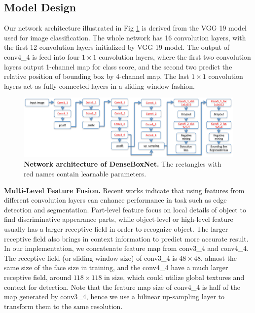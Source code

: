 \subsection{Model Design } 

Our network architecture illustrated in Fig \ref{fig:fig_net} is derived from the VGG 19 model used for image classification\cite{simonyan2014very}. The whole network has 16 convolution layers, with the first 12 convolution layers initialized by VGG 19 model.  The output of conv4\_4 is feed into four $1 \times 1$ convolution layers, where the first two convolution layers output 1-channel map for class score, and the second two predict the relative position of bounding box by 4-channel map.  The last $1 \times 1$ convolution layers act as fully connected layers in a sliding-window fashion.  


	\begin{figure}[!hbtp]
	\centering
	 \includegraphics[scale=0.55]{figures/figure3-crop.pdf}
	\caption{\textbf{Network architecture of DenseBoxNet.} The rectangles with red names contain learnable parameters. }
	\label{fig:fig_net}
	\end{figure}



\textbf{Multi-Level Feature Fusion.} 
Recent works\cite{bertasius2014deepedge, liu2015parsenet} indicate that using features from different convolution layers can enhance performance in task such as edge detection and segmentation. Part-level feature focus on local details of object to find discriminative appearance parts, while object-level or high-level feature usually has a larger receptive field in order to recognize object. The larger receptive field also brings in context information to predict more accurate result. In our implementation, we concatenate feature map from conv3\_4 and conv4\_4. The receptive field (or sliding window size) of conv3\_4 is $48 \times 48$, almost the same size of the face size in training, and the conv4\_4 have a much larger receptive field, around $118 \times 118$ in size, which could utilize global textures and context for detection.  Note that the feature map size of conv4\_4 is half of the map generated by conv3\_4, hence we use a bilinear up-sampling layer to transform them to the same resolution. 

